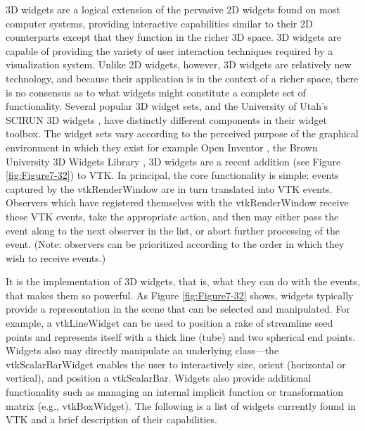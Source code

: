 3D widgets are a logical extension of the pervasive 2D widgets found on most computer systems, providing interactive capabilities similar to their 2D counterparts except that they function in the richer 3D space. 3D widgets are capable of providing the variety of user interaction techniques required by a visualization system. Unlike 2D widgets, however, 3D widgets are relatively new technology, and because their application is in the context of a richer space, there is no consensus as to what widgets might constitute a complete set of functionality. Several popular 3D widget sets, and the University of Utah's SCIRUN 3D widgets \cite{Purciful95}, have distinctly different components in their widget toolbox. The widget sets vary according to the perceived purpose of the graphical environment in which they exist for example Open Inventor \cite{Wernecke94}, the Brown University 3D Widgets Library \cite{Zeleznik93},  3D widgets are a recent addition (see Figure \ref{fig:Figure7-32}) to VTK. In principal, the core functionality is simple: events captured by the vtkRenderWindow are in turn translated into VTK events. Observers which have registered themselves with the vtkRenderWindow receive these VTK events, take the appropriate action, and then may either pass the event along to the next observer in the list, or abort further processing of the event. (Note: observers can be prioritized according to the order in which they wish to receive events.)

It is the implementation of 3D widgets, that is, what they can do with the events, that makes them so powerful. As Figure \ref{fig:Figure7-32} shows, widgets typically provide a representation in the scene that can be selected and manipulated. For example, a vtkLineWidget can be used to position a rake of streamline seed points and represents itself with a thick line (tube) and two spherical end points. Widgets also may directly manipulate an underlying class---the vtkScalarBarWidget enables the user to interactively size, orient (horizontal or vertical), and position a vtkScalarBar. Widgets also provide additional functionality such as managing an internal implicit function or transformation matrix (e.g., vtkBoxWidget). The following is a list of widgets currently found in VTK and a brief description of their capabilities.

